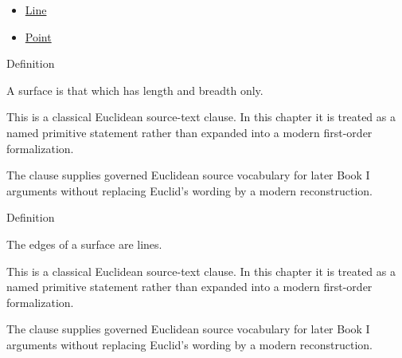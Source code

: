 \begin{lra-not-visible}
\begin{dependencies}
\begin{itemize}
  \item \hyperref[def:euclid-line]{Line}
  \item \hyperref[def:euclid-point]{Point}
\end{itemize}
\end{dependencies}
\end{lra-not-visible}

\begin{definitionbox}{Definition}
\begin{definition}[Surface]
\label{def:euclid-surface}
A surface is that which has length and breadth only.
\end{definition}
\end{definitionbox}
\begin{remark*}
This is a classical Euclidean source-text clause. In this chapter it is treated
as a named primitive statement rather than expanded into a modern first-order
formalization.
\end{remark*}

\begin{remark*}[Interpretation]
The clause supplies governed Euclidean source vocabulary for later Book I
arguments without replacing Euclid's wording by a modern reconstruction.
\end{remark*}

\begin{lra-not-visible}
\DefinitionalRoot
\end{lra-not-visible}

\begin{definitionbox}{Definition}
\begin{definition}
\label{def:euclid-edges-of-a-surface}
The edges of a surface are lines.
\end{definition}
\end{definitionbox}
\begin{remark*}
This is a classical Euclidean source-text clause. In this chapter it is treated
as a named primitive statement rather than expanded into a modern first-order
formalization.
\end{remark*}

\begin{remark*}[Interpretation]
The clause supplies governed Euclidean source vocabulary for later Book I
arguments without replacing Euclid's wording by a modern reconstruction.
\end{remark*}

